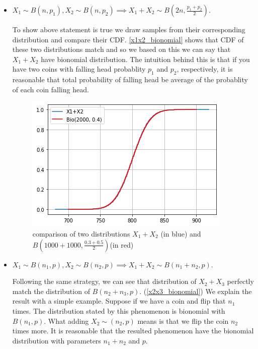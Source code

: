 \documentclass[12pt, a4paper]{book}
\begin{document}
\begin{itemize}
    \item $X_1 \sim B(n, p_1), X_2 \sim B(n, p_2) \implies X_1+X_2 \sim B(2n, \frac{p_1+p_2}{2})$.

    To show above statement is true we draw samples from their corresponding distribution and
    compare their CDF. \autoref{x1x2_bionomial} shows that CDF of these two distributions
    match and so we based on this we can say that $X_1+X_2$ have bionomial distribution.
    The intuition behind this is that if you have two coins with falling head probablity $p_1$ and
    $p_2$, respectively, it is reasonable that total probability
    of falling head be average of the probablity of each coin falling head.

    \begin{figure}[h]
        \centering
        \includegraphics[width=0.6\linewidth]{images/question9/x1x2_corrected.png}
        \caption{comparison of two distributions $X_1+X_2$ (in blue) and $B(1000+1000, \frac{0.3+0.5}{2})$(in red)}
        \label{x1x2_bionomial}
    \end{figure}

    \item $X_1 \sim B(n_1, p), X_2 \sim B(n_2, p) \implies X_1+X_2 \sim B(n_1+n_2, p)$.

    Following the same strategy, we can see that distribution of $X_2+X_3$ perfectly match the
    distribution of $B(n_2+n_3, p)$. (\autoref{x2x3_bionomial}) We explain the result with a simple example.
    Suppose if we have a coin and flip that $n_1$ times. The distribution stated by this phenomenon
    is bionomial with $B(n_1, p)$. What adding $X_2 \sim (n_2, p)$ means is that we flip the coin $n_2$ times more.
    It is reasonable that the resulted phenomenon have the bionomial distribution with parameters $n_1+n_2$ and $p$.


\end{itemize}
\end{document}
